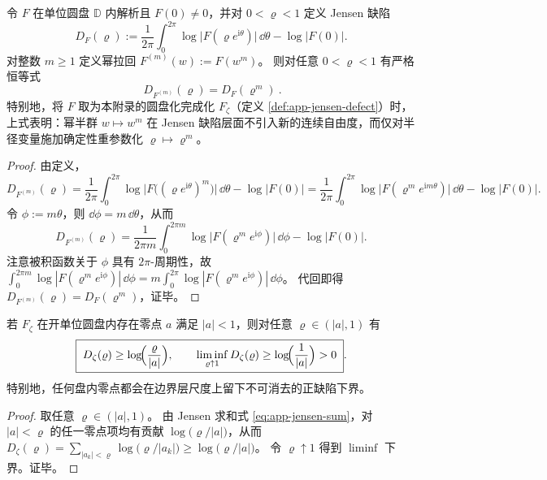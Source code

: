 \begin{proposition}\label{prop:app-jensen-defect-power-covariance}
令 \(F\) 在单位圆盘 \(\mathbb{D}\) 内解析且 \(F(0)\neq 0\)，并对 \(0<\varrho<1\) 定义 Jensen 缺陷
\[
D_F(\varrho):=\frac{1}{2\pi}\int_{0}^{2\pi}\log\bigl|F(\varrho e^{\mathrm{i}\theta})\bigr|\,\dd\theta-\log|F(0)|.
\]
对整数 \(m\ge 1\) 定义幂拉回 \(F^{(m)}(w):=F(w^m)\)。
则对任意 \(0<\varrho<1\) 有严格恒等式
\begin{equation}\label{eq:app-jensen-defect-power-covariance}
\boxed{\ D_{F^{(m)}}(\varrho)=D_F(\varrho^m)\ }.
\end{equation}
特别地，将 \(F\) 取为本附录的圆盘化完成化 \(F_{\zeta}\)（定义 \ref{def:app-jensen-defect}）时，上式表明：幂半群 \(w\mapsto w^m\) 在 Jensen 缺陷层面不引入新的连续自由度，而仅对半径变量施加确定性重参数化 \(\varrho\mapsto \varrho^m\)。
\end{proposition}
\begin{proof}
由定义，
\[
D_{F^{(m)}}(\varrho)
=\frac{1}{2\pi}\int_{0}^{2\pi}\log\bigl|F\!\bigl((\varrho e^{\mathrm{i}\theta})^m\bigr)\bigr|\,\dd\theta-\log|F(0)|
=\frac{1}{2\pi}\int_{0}^{2\pi}\log\bigl|F(\varrho^m e^{\mathrm{i}m\theta})\bigr|\,\dd\theta-\log|F(0)|.
\]
令 \(\phi:=m\theta\)，则 \(\dd\phi=m\,\dd\theta\)，从而
\[
D_{F^{(m)}}(\varrho)
=\frac{1}{2\pi m}\int_{0}^{2\pi m}\log\bigl|F(\varrho^m e^{\mathrm{i}\phi})\bigr|\,\dd\phi-\log|F(0)|.
\]
注意被积函数关于 \(\phi\) 具有 \(2\pi\)-周期性，故
\(
\int_{0}^{2\pi m}\log|F(\varrho^m e^{\mathrm{i}\phi})|\,\dd\phi
=m\int_{0}^{2\pi}\log|F(\varrho^m e^{\mathrm{i}\phi})|\,\dd\phi
\)。
代回即得 \(D_{F^{(m)}}(\varrho)=D_F(\varrho^m)\)，证毕。
\end{proof}

\begin{proposition}\label{prop:app-jensen-single-zero-lower-bound}
若 \(F_{\zeta}\) 在开单位圆盘内存在零点 \(a\) 满足 \(|a|<1\)，则对任意 \(\varrho\in(|a|,1)\) 有
\begin{equation}\label{eq:app-jensen-single-zero-lower-bound}
\boxed{\;
D_{\zeta}(\varrho)\ge \log\!\Bigl(\frac{\varrho}{|a|}\Bigr),
\qquad
\liminf_{\varrho\uparrow 1}D_{\zeta}(\varrho)\ge \log\!\Bigl(\frac{1}{|a|}\Bigr)>0\; }.
\end{equation}
特别地，任何盘内零点都会在边界层尺度上留下不可消去的正缺陷下界。
\end{proposition}
\begin{proof}
取任意 \(\varrho\in(|a|,1)\)。
由 Jensen 求和式 \eqref{eq:app-jensen-sum}，对 \(|a|<\varrho\) 的任一零点项均有贡献
\(
\log\bigl(\varrho/|a|\bigr)
\)，从而
\(
D_{\zeta}(\varrho)=\sum_{|a_k|<\varrho}\log\bigl(\varrho/|a_k|\bigr)\ge \log\bigl(\varrho/|a|\bigr)
\)。
令 \(\varrho\uparrow 1\) 得到 \(\liminf\) 下界。证毕。
\end{proof}

